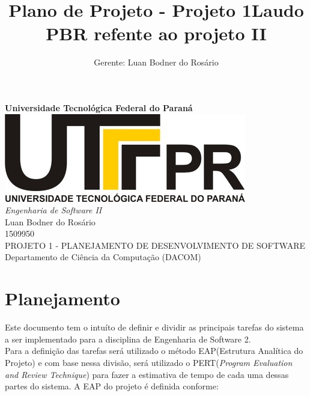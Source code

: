 \documentclass[12pt,a4paper,final]{article}
\author{Gerente: Luan Bodner do Rosário}
\title{Plano de Projeto - Projeto 1}
\title{Laudo PBR refente ao projeto II }
\begin{document}
      	\begin{titlepage}
       	\LARGE
       	\begin{center}
       	\vspace{5cm} 
       	\textbf{Universidade Tecnológica Federal do Paraná \\ \vspace{1.8cm}}
       	\includegraphics[scale=0.35]{logoutfpr.jpg} \\ \vspace{1.8cm}
       	\textit{Engenharia de Software II} \vspace{2cm} \\
       	Luan Bodner do Rosário \\ 1509950 \vspace{2cm} \\ 
       	PROJETO 1 - PLANEJAMENTO DE DESENVOLVIMENTO DE SOFTWARE \vspace{2cm} \\
      	Departamento de Ciência da Computação (DACOM) 
       	
   	\end{center}
    \end{titlepage}	

\tableofcontents
\newpage
\section{Planejamento}

Este documento tem o intuíto de definir e dividir as principais tarefas do sistema a ser implementado para a disciplina de Engenharia de Software 2.\\
Para a definição das tarefas será utilizado o método EAP(Estrutura Analítica do Projeto) e com base nessa divisão, será utilizado o PERT(\textit{Program Evaluation and Review Technique}) para fazer a estimativa de tempo de cada uma dessas partes do sistema.
A EAP do projeto é definida conforme:
\end{document}
